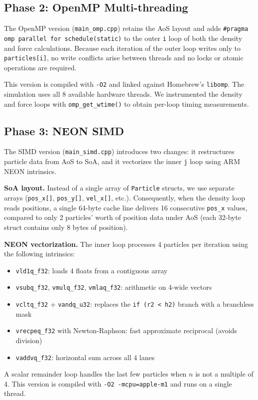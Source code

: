 \documentclass[12pt, a4paper]{article}
\begin{document}
\subsection{Phase 2: OpenMP Multi-threading}
The OpenMP version (\texttt{main\_omp.cpp}) retains the AoS layout and adds \texttt{\#pragma omp parallel for schedule(static)} to the outer \texttt{i} loop of both the density and force calculations. Because each iteration of the outer loop writes only to \texttt{particles[i]}, no write conflicts arise between threads and no locks or atomic operations are required.

This version is compiled with \texttt{-O2} and linked against Homebrew's \texttt{libomp}. The simulation uses all 8 available hardware threads. We instrumented the density and force loops with \texttt{omp\_get\_wtime()} to obtain per-loop timing measurements.

\subsection{Phase 3: NEON SIMD}
The SIMD version (\texttt{main\_simd.cpp}) introduces two changes: it restructures particle data from AoS to SoA, and it vectorizes the inner \texttt{j} loop using ARM NEON intrinsics.

\textbf{SoA layout.} Instead of a single array of \texttt{Particle} structs, we use separate arrays (\texttt{pos\_x[]}, \texttt{pos\_y[]}, \texttt{vel\_x[]}, etc.). Consequently, when the density loop reads positions, a single 64-byte cache line delivers 16 consecutive \texttt{pos\_x} values, compared to only 2 particles' worth of position data under AoS (each 32-byte struct contains only 8 bytes of position).

\textbf{NEON vectorization.} The inner loop processes 4 particles per iteration using the following intrinsics:
\begin{itemize}
    \item \texttt{vld1q\_f32}: loads 4 floats from a contiguous array
    \item \texttt{vsubq\_f32}, \texttt{vmulq\_f32}, \texttt{vmlaq\_f32}: arithmetic on 4-wide vectors
    \item \texttt{vcltq\_f32} + \texttt{vandq\_u32}: replaces the \texttt{if (r2 < h2)} branch with a branchless mask
    \item \texttt{vrecpeq\_f32} with Newton-Raphson: fast approximate reciprocal (avoids division)
    \item \texttt{vaddvq\_f32}: horizontal sum across all 4 lanes
\end{itemize}
A scalar remainder loop handles the last few particles when $n$ is not a multiple of 4. This version is compiled with \texttt{-O2 -mcpu=apple-m1} and runs on a single thread.
\end{document}
